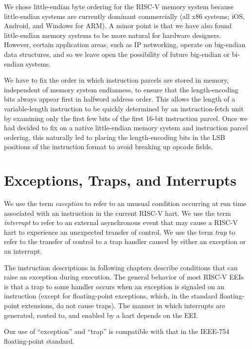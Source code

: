 \begin{commentary}
We chose little-endian byte ordering for the RISC-V memory system
because little-endian systems are currently dominant commercially (all
x86 systems; iOS, Android, and Windows for ARM).  A minor point is
that we have also found little-endian memory systems to be more
natural for hardware designers.  However, certain application areas,
such as IP networking, operate on big-endian data structures, and so
we leave open the possibility of future big-endian or bi-endian
systems.

We have to fix the order in which instruction parcels are stored in
memory, independent of memory system endianness, to ensure that the
length-encoding bits always appear first in halfword address
order. This allows the length of a variable-length instruction to be
quickly determined by an instruction-fetch unit by examining only the
first few bits of the first 16-bit instruction parcel.  Once we had
decided to fix on a native little-endian memory system and instruction parcel
ordering, this naturally led to placing the length-encoding bits in
the LSB positions of the instruction format to avoid breaking up
opcode fields.
\end{commentary}

\section{Exceptions, Traps, and Interrupts}

We use the term {\em exception} to refer to an unusual condition
occurring at run time associated with an instruction in the current
RISC-V hart.  We use the term {\em interrupt} to refer to an external
asynchronous event that may cause a RISC-V hart to experience an
unexpected transfer of control.  We use the term {\em trap} to refer
to the transfer of control to a trap handler caused by either an
exception or an interrupt.

The instruction descriptions in following chapters describe conditions
that can raise an exception during execution.  The general behavior of
most RISC-V EEIs is that a trap to some handler occurs when an
exception is signaled on an instruction (except for floating-point
exceptions, which, in the standard floating-point extensions, do not
cause traps).  The manner in which interrupts are generated, routed
to, and enabled by a hart depends on the EEI.

\begin{commentary}
Our use of ``exception'' and ``trap'' is compatible with that in the IEEE-754
floating-point standard.
\end{commentary}

